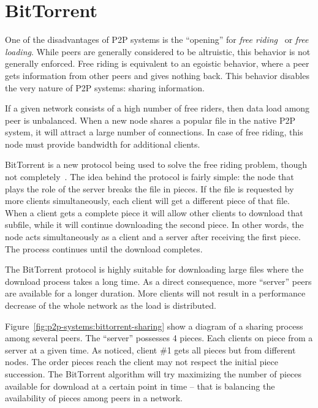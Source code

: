 \section{BitTorrent}
\label{sec:p2p-systems:bittorrent}

One of the disadvantages of P2P systems is the ``opening'' for \textit{free
riding}~\cite{free-riding} or \textit{free loading}. While peers are generally
considered to be altruistic, this behavior is not generally enforced. Free
riding is equivalent to an egoistic behavior, where a peer gets information
from other peers and gives nothing back. This behavior disables the very
nature of P2P systems: sharing information.

If a given network consists of a high number of free riders, then data load
among peer is unbalanced. When a new node shares a popular file in the native
P2P system, it will attract a large number of connections. In case of free
riding, this node must provide bandwidth for additional clients.

BitTorrent is a new protocol being used to solve the free riding problem,
though not completely~\cite{free-riding}. The idea behind the protocol is
fairly simple: the node that plays the role of the server breaks the file in
pieces. If the file is requested by more clients simultaneously, each client
will get a different piece of that file. When a client gets a complete piece
it will allow other clients to download that subfile, while it will continue
downloading the second piece. In other words, the node acts simultaneously as
a client and a server after receiving the first piece. The process continues
until the download completes.

The BitTorrent protocol is highly suitable for downloading large files where
the download process takes a long time. As a direct consequence, more
``server'' peers are available for a longer duration. More clients will not
result in a performance decrease of the whole network as the load is
distributed.

Figure~\ref{fig:p2p-systems:bittorrent-sharing} show a diagram of a sharing
process among several peers. The ``server'' possesses 4 pieces. Each clients
on piece from a server at a given time. As noticed, client \#1 gets all pieces
but from different nodes. The order pieces reach the client may not respect
the initial piece succession. The BitTorrent algorithm will try maximizing the
number of pieces available for download at a certain point in time -- that is
balancing the availability of pieces among peers in a network.

